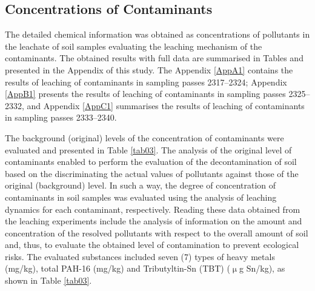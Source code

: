 \documentclass[algorithms,article,accept,pdftex,moreauthors]{Definitions/mdpi}
\begin{document}
\vspace{-8pt}
\subsection{Concentrations of Contaminants}

{The detailed chemical information was obtained as concentrations of pollutants in the leachate of soil samples evaluating the leaching mechanism of the contaminants. The obtained results with full data are summarised in Tables and presented in the Appendix of this study. The Appendix} \ref{AppA1} {contains the results of leaching of contaminants in sampling passes 2317--2324; Appendix} \ref{AppB1} {presents the results of leaching of contaminants in sampling passes 2325--2332, and Appendix }\ref{AppC1} {summarises the results of leaching of contaminants in sampling passes 2333--2340. }

The background (original) levels of the concentration of contaminants were evaluated and presented in Table \ref{tab03}. {The} analysis of the original level of contaminants enabled to perform the evaluation of the decontamination of soil based on the discriminating {the }actual values of pollutants against those of the original (background) level. In such a way, the degree of concentration of contaminants in soil samples was evaluated using {the }analysis of leaching dynamics for each contaminant, respectively. Reading these data obtained from the leaching experiments include the analysis of information on {the }amount and concentration of the resolved pollutants with respect to the overall amount of soil and, thus, to evaluate the obtained level of contamination to prevent ecological risks. The evaluated {substances} included seven (7) types of heavy metals (mg/kg), total PAH-16 (mg/kg) and Tributyltin-Sn (TBT) ($\upmu$g Sn/kg), as shown in Table \ref{tab03}. 
\end{document}
